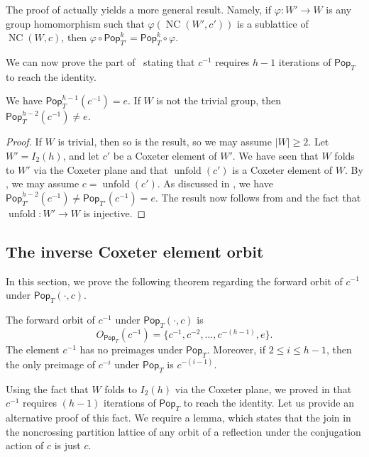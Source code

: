 \documentclass[ALCO,ThmDefs,Unicode,epreuves]{cedram}
\newcommand{\pop}{\mathsf{Pop}}
\DeclareMathOperator{\NC}{NC}
\DeclareMathOperator{\unfold}{unfold}
\begin{document}
\begin{rema}
The proof of  actually yields a more general result. Namely, if $\varphi\colon W'\to W$ is any group homomorphism such that $\varphi(\NC(W',c'))$ is a sublattice of $\NC(W,c)$, then $\varphi\circ\pop_{T'}^k=\pop_T^k\circ\varphi$. 
\end{rema}

We can now prove the part of~ stating that $c^{-1}$ requires $h-1$ iterations of $\pop_T$ to reach the identity.
\begin{coro}\label{cor:cinverseorbit}
We have $\pop_T^{h-1}(c^{-1})=e$. If $W$ is not the trivial group, then $\pop_T^{h-2}(c^{-1})\neq e$.
\end{coro}
\begin{proof}
If $W$ is trivial, then so is the result, so we may assume $|W|\geq 2$. Let $W'=I_2(h)$, and let $c'$ be a Coxeter element of $W'$. We have seen that $W$ folds to $W'$ via the Coxeter plane and that $\unfold(c')$ is a Coxeter element of $W$. By , we may assume $c=\unfold(c')$. As discussed in , we have $\pop_{T'}^{h-2}(c^{-1})\neq\pop_{T'}(c^{-1})=e$. The result now follows from  and the fact that $\unfold:W'\to W$ is injective.
\end{proof}

\subsection{The inverse Coxeter element orbit}
\label{sec:inverse_c_orbit}

In this section, we prove the following theorem regarding the forward orbit of $c^{-1}$ under $\pop_T(\cdot,c)$.
\begin{theorem}
The forward orbit of $c^{-1}$ under $\pop_T(\cdot,c)$ is 
\[
O_{\pop_T}(c^{-1})=\{c^{-1}, c^{-2},\ldots, c^{-(h-1)}, e\}.
\]
 The element $c^{-1}$ has no preimages under $\pop_T$. Moreover, if $2\leq i\leq h-1$, then the only preimage of $c^{-i}$ under $\pop_T$ is $c^{-(i-1)}$. 
\end{theorem}

Using the fact that $W$ folds to $I_2(h)$ via the Coxeter plane, we proved in  that $c^{-1}$ requires $(h-1)$ iterations of $\pop_T$ to reach the identity. Let us provide an alternative proof of this fact. We require a lemma, which states that the join in the noncrossing partition lattice of any orbit of a reflection under the conjugation action of $c$ is just $c$. 
\end{document}
